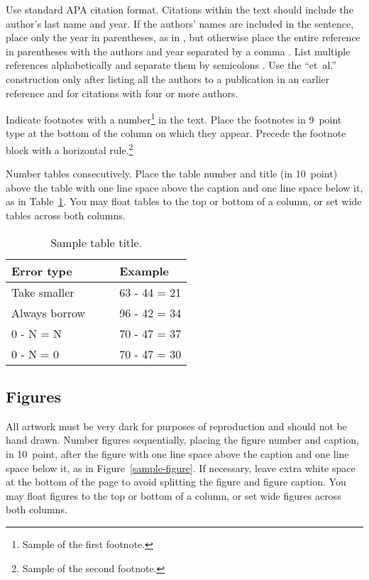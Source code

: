 \documentclass[10pt,letterpaper]{article}
\begin{document}
Use standard APA citation format. Citations within the text should
include the author's last name and year. If the authors' names are
included in the sentence, place only the year in parentheses, as in
, but otherwise place the entire reference in
parentheses with the authors and year separated by a comma
\cite{Nathan2012}. List multiple references alphabetically and
separate them by semicolons
\cite{Nathan2012,KoedNath2004}. Use the
``et~al.'' construction only after listing all the authors to a
publication in an earlier reference and for citations with four or
more authors.

Indicate footnotes with a number\footnote{Sample of the first
footnote.} in the text. Place the footnotes in 9~point type at the
bottom of the column on which they appear. Precede the footnote block
with a horizontal rule.\footnote{Sample of the second footnote.}

Number tables consecutively. Place the table number and title (in
10~point) above the table with one line space above the caption and
one line space below it, as in Table~\ref{sample-table}. You may float
tables to the top or bottom of a column, or set wide tables across
both columns.

\begin{table}[!ht]
\begin{center} 
\caption{Sample table title.} 
\label{sample-table} 
\vskip 0.12in
\begin{tabular}{ll} 
\hline
Error type    &  Example \\
\hline
Take smaller        &   63 - 44 = 21 \\
Always borrow~~~~   &   96 - 42 = 34 \\
0 - N = N           &   70 - 47 = 37 \\
0 - N = 0           &   70 - 47 = 30 \\
\hline
\end{tabular} 
\end{center} 
\end{table}


\subsection{Figures}

All artwork must be very dark for purposes of reproduction and should
not be hand drawn. Number figures sequentially, placing the figure
number and caption, in 10~point, after the figure with one line space
above the caption and one line space below it, as in
Figure~\ref{sample-figure}. If necessary, leave extra white space at
the bottom of the page to avoid splitting the figure and figure
caption. You may float figures to the top or bottom of a column, or
set wide figures across both columns.
\end{document}
